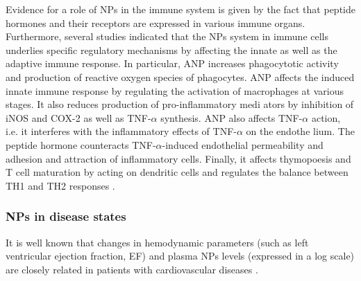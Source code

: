 \documentclass[14pt,a4paper,onecolumn]{extarticle}
\begin{document}
Evidence for a role of NPs in the immune system is given by the fact that peptide hormones and their receptors are expressed in various immune organs. Furthermore, several studies indicated that the NPs system in immune cells underlies specific regulatory mechanisms by affecting the innate as well as the adaptive immune response. In particular, ANP increases phagocytotic activity and production of reactive oxygen species of phagocytes. ANP affects the induced innate immune response by regulating the activation of macrophages at various stages. It also reduces production of pro-inflammatory medi ators by inhibition of iNOS and COX-2 as well as TNF-$\alpha$ synthesis. ANP also affects TNF-$\alpha$ action, i.e. it interferes with the inflammatory effects of TNF-$\alpha$ on the endothe lium. The peptide hormone counteracts TNF-$\alpha$-induced endothelial permeability and adhesion and attraction of inflammatory cells. Finally, it affects thymopoesis and T cell maturation by acting on dendritic cells and regulates the balance between TH1 and TH2 responses \citep{99}. %




\subsubsection{NPs in disease states}

It is well known that changes in hemodynamic parameters (such as left ventricular ejection fraction, EF) and plasma NPs levels (expressed in a log scale) are closely related in patients with cardiovascular diseases \citep{bib364}.

\end{document}
